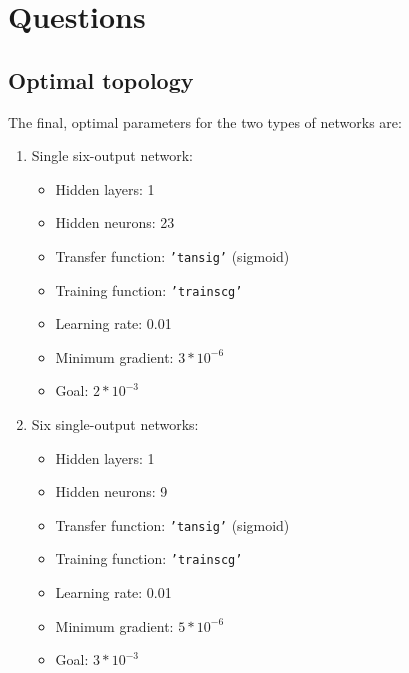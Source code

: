 \documentclass[a4paper]{article}
\begin{document}
\clearpage


\section{Questions}
\subsection{Optimal topology}
The final, optimal parameters for the two types of networks are:
\begin{enumerate}
\item Single six-output network:
\begin{itemize}
\item Hidden layers: 1
\item Hidden neurons: 23
\item Transfer function: \texttt{'tansig'} (sigmoid)
\item Training function: \texttt{'trainscg'}
\item Learning rate: 0.01
\item Minimum gradient: $3*10^{-6}$
\item Goal: $2*10^{-3}$
\end{itemize}
\item Six single-output networks:
\begin{itemize}
\item Hidden layers: 1
\item Hidden neurons: 9
\item Transfer function: \texttt{'tansig'} (sigmoid)
\item Training function: \texttt{'trainscg'}
\item Learning rate: 0.01
\item Minimum gradient: $5*10^{-6}$
\item Goal: $3*10^{-3}$
\end{itemize}
\end{enumerate}
\end{document}
